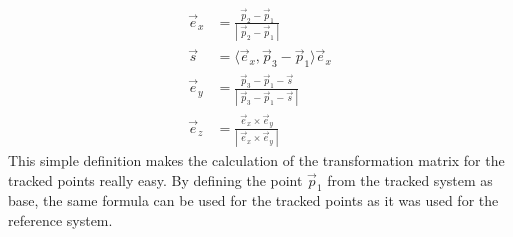 \begin{align}
\vec{e}_{x} &= \frac{\vec{p}_{2} - \vec{p}_{1}}{\left |~ \vec{p}_{2} - \vec{p}_{1} ~\right |} \\
\vec{s} &= \langle\vec{e}_{x},\vec{p}_{3}-\vec{p}_{1}\rangle\vec{e}_{x} \\
\vec{e}_{y} &= \frac{\vec{p}_{3} - \vec{p}_{1} - \vec{s}}{\left |~ \vec{p}_{3} - \vec{p}_{1} - \vec{s}~\right |} \\
\vec{e}_{z} &= \frac{\vec{e}_{x} \times \vec{e}_{y}}{\left |~\vec{e}_{x} \times \vec{e}_{y}~\right |}
\end{align}
This simple definition makes the calculation of the transformation matrix for the tracked points really easy. By defining the point $\vec{p}_{1}$ from the tracked system as base, the same formula can be used for the tracked points as it was used for the reference system.
